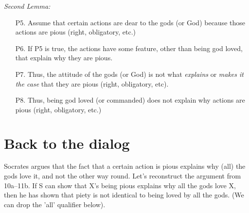 \documentclass[oneside]{article}
\begin{document}
\noindent \emph{Second Lemma:}
\begin{enumerate}
\item[P5.] Assume that certain actions are dear to the gods (or God) because those actions are pious (right, obligatory, etc.)
\item[P6.] If P5 is true, the actions have some feature, other than being god loved, that explain why they are pious. 
\item[P7.] Thus,  the attitude of the gods (or God) is not what \emph{explains} or \emph{makes it the case} that they are pious (right, obligatory, etc).
\item[P8.] Thus, being god loved (or commanded) does not explain why actions are pious (right, obligatory, etc.)
\end{enumerate}

\section*{Back to the dialog}
\noindent Socrates argues that the fact that a certain action is pious explains why (all) the gods love it, and not the other way round. Let's reconstruct the argument from 10a--11b. If S can show that X's being pious explains why all the gods love X, then he has shown that piety is not identical to being loved by all the gods. (We can drop the 'all' qualifier below). 
\end{document}
